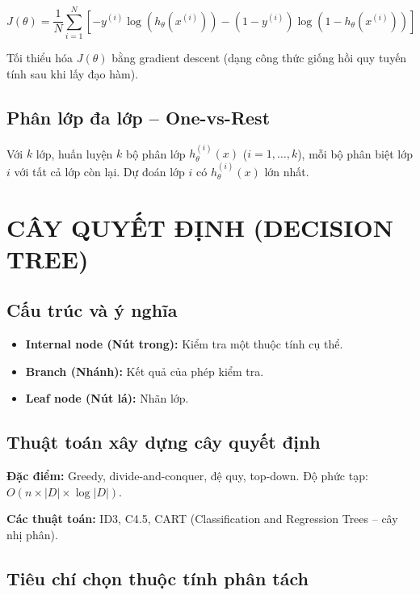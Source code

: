 \documentclass[10pt]{article}
\begin{document}
\[
J(\theta) = \frac{1}{N}\sum_{i=1}^{N}\left[-y^{(i)}\log(h_\theta(x^{(i)})) - (1-y^{(i)})\log(1-h_\theta(x^{(i)}))\right]
\]

Tối thiểu hóa $J(\theta)$ bằng gradient descent (dạng công thức giống hồi quy tuyến tính sau khi lấy đạo hàm).

\subsection{Phân lớp đa lớp -- One-vs-Rest}

Với $k$ lớp, huấn luyện $k$ bộ phân lớp $h_\theta^{(i)}(x)$ ($i=1,\ldots,k$), mỗi bộ phân biệt lớp $i$ với tất cả lớp còn lại. Dự đoán lớp $i$ có $h_\theta^{(i)}(x)$ lớn nhất.

\section{CÂY QUYẾT ĐỊNH (DECISION TREE)}

\subsection{Cấu trúc và ý nghĩa}

\begin{itemize}
    \item \textbf{Internal node (Nút trong):} Kiểm tra một thuộc tính cụ thể.
    \item \textbf{Branch (Nhánh):} Kết quả của phép kiểm tra.
    \item \textbf{Leaf node (Nút lá):} Nhãn lớp.
\end{itemize}

\subsection{Thuật toán xây dựng cây quyết định}

\textbf{Đặc điểm:} Greedy, divide-and-conquer, đệ quy, top-down. Độ phức tạp: $O(n \times |D| \times \log|D|)$.

\textbf{Các thuật toán:} ID3, C4.5, CART (Classification and Regression Trees -- cây nhị phân).

\subsection{Tiêu chí chọn thuộc tính phân tách}
\end{document}
